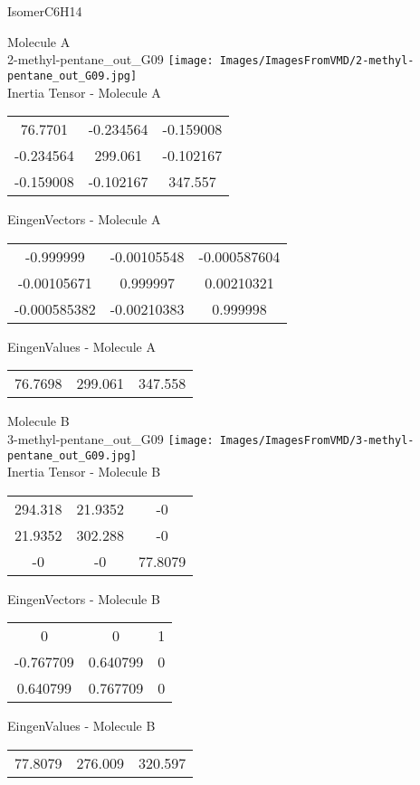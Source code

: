 \vtab[-2cm]
\begin{center}
{\large IsomerC6H14}
\end{center}
\begin{multicols}{2}
\begin{center}
Molecule A \\ 
2-methyl-pentane\_out\_G09
\texttt{[image: Images/ImagesFromVMD/2-methyl-pentane\_out\_G09.jpg]}
\\
Inertia Tensor - Molecule A \\
\vtab
\begin{tabular}{|c c c|}
76.7701	 & 	-0.234564	 & 	-0.159008	 \\
-0.234564	 & 	299.061	 & 	-0.102167	 \\
-0.159008	 & 	-0.102167	 & 	347.557
\end{tabular}

\vtab
 EingenVectors - Molecule A     \\
\vtab
\begin{tabular}{|c c c|}
-0.999999	 & 	-0.00105548	 & 	-0.000587604	 \\
-0.00105671	 & 	0.999997	 & 	0.00210321	 \\
-0.000585382	 & 	-0.00210383	 & 	0.999998
\end{tabular}

\vtab
 EingenValues - Molecule A     \\
\vtab
\begin{tabular}{|c c c|}
76.7698	 & 	299.061	 & 	347.558
\end{tabular}
\columnbreak

Molecule B \\ 
3-methyl-pentane\_out\_G09
\texttt{[image: Images/ImagesFromVMD/3-methyl-pentane\_out\_G09.jpg]}
\\
Inertia Tensor - Molecule B \\
\vtab
\begin{tabular}{|c c c|}
294.318	 & 	21.9352	 & 	-0	 \\
21.9352	 & 	302.288	 & 	-0	 \\
-0	 & 	-0	 & 	77.8079
\end{tabular}

\vtab
 EingenVectors - Molecule B     \\
\vtab
\begin{tabular}{|c c c|}
0	 & 	0	 & 	1	 \\
-0.767709	 & 	0.640799	 & 	0	 \\
0.640799	 & 	0.767709	 & 	0
\end{tabular}

\vtab
 EingenValues - Molecule B     \\
\vtab
\begin{tabular}{|c c c|}
77.8079	 & 	276.009	 & 	320.597
\end{tabular}

\end{center}
\end{multicols}
